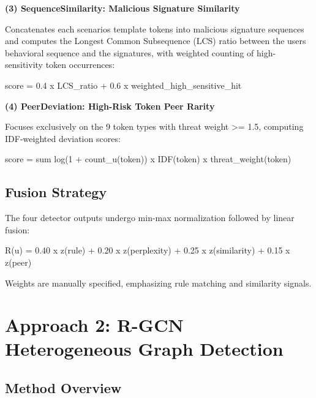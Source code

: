 \documentclass[
  a4paper,
  11pt]{article}
\newenvironment{Shaded}{}{}
\newcommand{\NormalTok}[1]{#1}
\begin{document}
\textbf{(3) SequenceSimilarity: Malicious Signature Similarity}

Concatenates each scenario\textquotesingle s template tokens into
malicious signature sequences and computes the Longest Common
Subsequence (LCS) ratio between the user\textquotesingle s behavioral
sequence and the signatures, with weighted counting of high-sensitivity
token occurrences:

\begin{Shaded}
\begin{Highlighting}[]
\NormalTok{score = 0.4 x LCS\_ratio + 0.6 x weighted\_high\_sensitive\_hit}
\end{Highlighting}
\end{Shaded}

\textbf{(4) PeerDeviation: High-Risk Token Peer Rarity}

Focuses exclusively on the 9 token types with threat weight
\textgreater= 1.5, computing IDF-weighted deviation scores:

\begin{Shaded}
\begin{Highlighting}[]
\NormalTok{score = sum log(1 + count\_u(token)) x IDF(token) x threat\_weight(token)}
\end{Highlighting}
\end{Shaded}

\subsection{Fusion Strategy}\label{fusion-strategy}

The four detector outputs undergo min-max normalization followed by
linear fusion:

\begin{Shaded}
\begin{Highlighting}[]
\NormalTok{R(u) = 0.40 x z(rule) + 0.20 x z(perplexity) + 0.25 x z(similarity) + 0.15 x z(peer)}
\end{Highlighting}
\end{Shaded}

Weights are manually specified, emphasizing rule matching and similarity
signals.

\section{Approach 2: R-GCN Heterogeneous Graph
Detection}\label{approach-2-r-gcn-heterogeneous-graph-detection}

\subsection{Method Overview}\label{method-overview-1}
\end{document}
